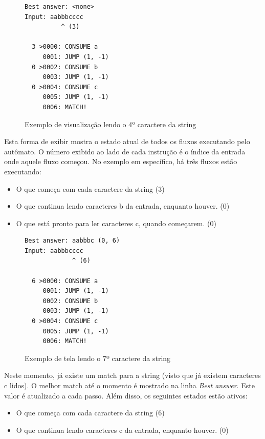 \documentclass[a4paper,12pt,oneside,onecolumn]{uerj}
\begin{document}
\begin{figure}[!htbp]
  \centering
\begin{verbatim}
Best answer: <none>
Input: aabbbcccc
          ^ (3)

  3 >0000: CONSUME a
     0001: JUMP (1, -1)
  0 >0002: CONSUME b
     0003: JUMP (1, -1)
  0 >0004: CONSUME c
     0005: JUMP (1, -1)
     0006: MATCH!
\end{verbatim}
  \caption{Exemplo de visualização lendo o 4º caractere da string}
  \label{fig:exemplo_view_passo_3}
\end{figure}

Esta forma de exibir mostra o estado atual de todos os fluxos executando pelo autômato. O número exibido ao lado de cada instrução é o índice da entrada onde aquele fluxo começou. No exemplo em específico, há três fluxos estão executando: 

\begin{itemize}
\item{O que começa com cada caractere da string (3)}
\item{O que continua lendo caracteres b da entrada, enquanto houver. (0)}
\item{O que está pronto para ler caracteres c, quando começarem. (0)}
\end{itemize}


\begin{figure}[!htbp]
  \centering
\begin{verbatim}
Best answer: aabbbc (0, 6)
Input: aabbbcccc
             ^ (6)

  6 >0000: CONSUME a
     0001: JUMP (1, -1)
     0002: CONSUME b
     0003: JUMP (1, -1)
  0 >0004: CONSUME c
     0005: JUMP (1, -1)
     0006: MATCH!
\end{verbatim}
  \caption{Exemplo de tela lendo o 7º caractere da string}
  \label{fig:exemplo_view_passo_6}
\end{figure}

Neste momento, já existe um match para a string (visto que já existem caracteres c lidos). O melhor match até o momento é mostrado na linha \emph{Best answer}. Este valor é atualizado a cada passo. Além disso, os seguintes estados estão ativos:

\begin{itemize}
\item{O que começa com cada caractere da string (6)}
\item{O que continua lendo caracteres c da entrada, enquanto houver. (0)}
\end{itemize}
\end{document}
